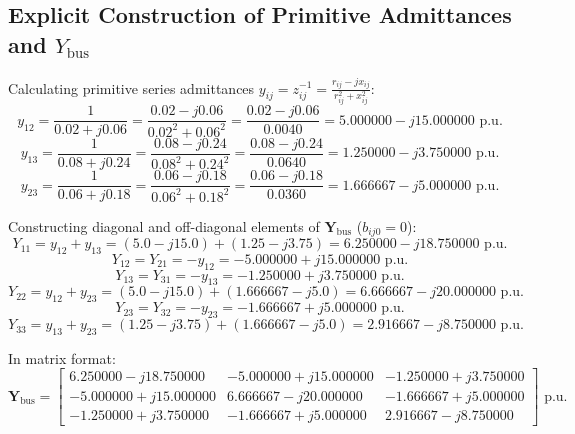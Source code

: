 \documentclass[12pt,a4paper,oneside]{report}
\begin{document}
\subsection{Explicit Construction of Primitive Admittances and $Y_{\text{bus}}$}
Calculating primitive series admittances $y_{ij} = z_{ij}^{-1} = \frac{r_{ij} - jx_{ij}}{r_{ij}^2 + x_{ij}^2}$:
\begin{equation}
y_{12} = \frac{1}{0.02 + j0.06} = \frac{0.02 - j0.06}{0.02^2 + 0.06^2} = \frac{0.02 - j0.06}{0.0040} = 5.000000 - j15.000000\text{ p.u.}
\end{equation}
\begin{equation}
y_{13} = \frac{1}{0.08 + j0.24} = \frac{0.08 - j0.24}{0.08^2 + 0.24^2} = \frac{0.08 - j0.24}{0.0640} = 1.250000 - j3.750000\text{ p.u.}
\end{equation}
\begin{equation}
y_{23} = \frac{1}{0.06 + j0.18} = \frac{0.06 - j0.18}{0.06^2 + 0.18^2} = \frac{0.06 - j0.18}{0.0360} = 1.666667 - j5.000000\text{ p.u.}
\end{equation}

Constructing diagonal and off-diagonal elements of $\mathbf{Y}_{\text{bus}}$ ($b_{ij0} = 0$):
\begin{equation}
Y_{11} = y_{12} + y_{13} = (5.0 - j15.0) + (1.25 - j3.75) = 6.250000 - j18.750000\text{ p.u.}
\end{equation}
\begin{equation}
Y_{12} = Y_{21} = -y_{12} = -5.000000 + j15.000000\text{ p.u.}
\end{equation}
\begin{equation}
Y_{13} = Y_{31} = -y_{13} = -1.250000 + j3.750000\text{ p.u.}
\end{equation}
\begin{equation}
Y_{22} = y_{12} + y_{23} = (5.0 - j15.0) + (1.666667 - j5.0) = 6.666667 - j20.000000\text{ p.u.}
\end{equation}
\begin{equation}
Y_{23} = Y_{32} = -y_{23} = -1.666667 + j5.000000\text{ p.u.}
\end{equation}
\begin{equation}
Y_{33} = y_{13} + y_{23} = (1.25 - j3.75) + (1.666667 - j5.0) = 2.916667 - j8.750000\text{ p.u.}
\end{equation}

In matrix format:
\begin{equation}
\mathbf{Y}_{\text{bus}} = \begin{bmatrix}
6.250000 - j18.750000 & -5.000000 + j15.000000 & -1.250000 + j3.750000 \\
-5.000000 + j15.000000 & 6.666667 - j20.000000 & -1.666667 + j5.000000 \\
-1.250000 + j3.750000 & -1.666667 + j5.000000 & 2.916667 - j8.750000
\end{bmatrix}\text{ p.u.}
\end{equation}
\end{document}
